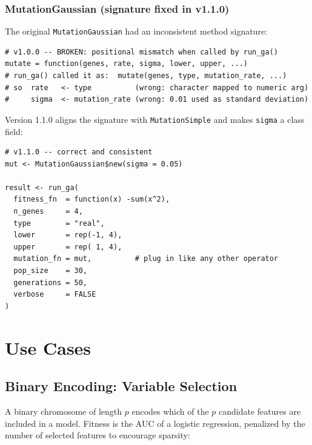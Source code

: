 \documentclass[11pt,a4paper]{article}
\begin{document}
\subsubsection{MutationGaussian (signature fixed in v1.1.0)}

The original \texttt{MutationGaussian} had an inconsistent method signature:

\begin{lstlisting}
# v1.0.0 -- BROKEN: positional mismatch when called by run_ga()
mutate = function(genes, rate, sigma, lower, upper, ...)
# run_ga() called it as:  mutate(genes, type, mutation_rate, ...)
# so  rate   <- type          (wrong: character mapped to numeric arg)
#     sigma  <- mutation_rate (wrong: 0.01 used as standard deviation)
\end{lstlisting}

Version 1.1.0 aligns the signature with \texttt{MutationSimple} and makes
\texttt{sigma} a class field:

\begin{lstlisting}
# v1.1.0 -- correct and consistent
mut <- MutationGaussian$new(sigma = 0.05)

result <- run_ga(
  fitness_fn  = function(x) -sum(x^2),
  n_genes     = 4,
  type        = "real",
  lower       = rep(-1, 4),
  upper       = rep( 1, 4),
  mutation_fn = mut,          # plug in like any other operator
  pop_size    = 30,
  generations = 50,
  verbose     = FALSE
)
\end{lstlisting}

\section{Use Cases}

\subsection{Binary Encoding: Variable Selection}

A binary chromosome of length $p$ encodes which of the $p$ candidate features
are included in a model. Fitness is the AUC of a logistic regression, penalized
by the number of selected features to encourage sparsity:
\end{document}
